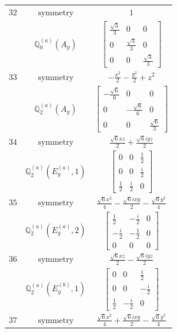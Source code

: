\documentclass[fleqn,8pt,landscape]{jsarticle}
\begin{document}
\begin{longtable}{ccc}
$ 32 $ & $ \text{symmetry} $ & $ 1 $ \\
$  $ & $ \mathbb{Q}_{0}^{(a)}(A_{g}) $ & $ \begin{bmatrix} \frac{\sqrt{3}}{3} & 0 & 0 \\ 0 & \frac{\sqrt{3}}{3} & 0 \\ 0 & 0 & \frac{\sqrt{3}}{3} \end{bmatrix} $ \\ \hline
$ 33 $ & $ \text{symmetry} $ & $ - \frac{x^{2}}{2} - \frac{y^{2}}{2} + z^{2} $ \\
$  $ & $ \mathbb{Q}_{2}^{(a)}(A_{g}) $ & $ \begin{bmatrix} - \frac{\sqrt{6}}{6} & 0 & 0 \\ 0 & - \frac{\sqrt{6}}{6} & 0 \\ 0 & 0 & \frac{\sqrt{6}}{3} \end{bmatrix} $ \\ \hline
$ 34 $ & $ \text{symmetry} $ & $ \frac{\sqrt{6} x z}{2} + \frac{\sqrt{6} i y z}{2} $ \\
$  $ & $ \mathbb{Q}_{2}^{(a)}(E_{g}^{(a)},1) $ & $ \begin{bmatrix} 0 & 0 & \frac{1}{2} \\ 0 & 0 & \frac{i}{2} \\ \frac{1}{2} & \frac{i}{2} & 0 \end{bmatrix} $ \\ \hline
$ 35 $ & $ \text{symmetry} $ & $ \frac{\sqrt{6} x^{2}}{4} - \frac{\sqrt{6} i x y}{2} - \frac{\sqrt{6} y^{2}}{4} $ \\
$  $ & $ \mathbb{Q}_{2}^{(a)}(E_{g}^{(a)},2) $ & $ \begin{bmatrix} \frac{1}{2} & - \frac{i}{2} & 0 \\ - \frac{i}{2} & - \frac{1}{2} & 0 \\ 0 & 0 & 0 \end{bmatrix} $ \\ \hline
$ 36 $ & $ \text{symmetry} $ & $ \frac{\sqrt{6} x z}{2} - \frac{\sqrt{6} i y z}{2} $ \\
$  $ & $ \mathbb{Q}_{2}^{(a)}(E_{g}^{(b)},1) $ & $ \begin{bmatrix} 0 & 0 & \frac{1}{2} \\ 0 & 0 & - \frac{i}{2} \\ \frac{1}{2} & - \frac{i}{2} & 0 \end{bmatrix} $ \\ \hline
$ 37 $ & $ \text{symmetry} $ & $ \frac{\sqrt{6} x^{2}}{4} + \frac{\sqrt{6} i x y}{2} - \frac{\sqrt{6} y^{2}}{4} $ \\

\end{longtable}
\end{document}
